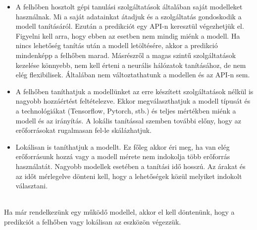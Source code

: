 \begin{itemize}
	\item A felhőben hosztolt gépi tanulási szolgáltatások általában saját modelleket használnak. Mi a saját adatainkat átadjuk és a szolgáltatás gondoskodik a modell tanításáról. Ezután a predikciót egy API-n keresztül végezhetjük el. Figyelni kell arra, hogy ebben az esetben nem mindig miénk a modell. Ha nincs lehetőség tanítás után a modell letöltésére, akkor a predikció mindenképp a felhőben marad. Másrészről a magas szintű szolgáltatások kezelése könnyebb, nem kell érteni a neurális hálózatok tanításához, de nem elég flexibilisek. Általában nem változtathatunk a modellen és az API-n sem.
	
	\item A felhőben taníthatjuk a modellünket az erre készített szolgáltatások nélkül is nagyobb hozzáértést feltételezve. Ekkor megválaszthatjuk a modell típusát és a technológiákat (Tensorflow, Pytorch, stb.) és teljes mértékben miénk a modell és az irányítás. A lokális tanítással szemben további előny, hogy az erőforrásokat rugalmasan fel-le skálázhatjuk.
	
	\item Lokálisan is taníthatjuk a modellt. Ez főleg akkor éri meg, ha van elég erőforrásunk hozzá vagy a modell mérete nem indokolja több erőforrás használatát. Nagyobb modellek esetében a tanítási idő hosszú. Az árakat és az időt mérlegelve dönteni kell, hogy a lehetőségek közül melyiket indokolt választani.
\end{itemize}
\ \\
Ha már rendelkezünk egy működő modellel, akkor el kell döntenünk, hogy a predikciót a felhőben vagy lokálisan az eszközön végezzük.

